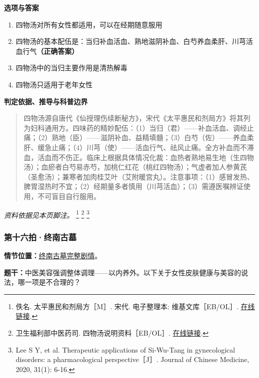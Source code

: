 \textbf{选项与答案}
\begin{enumerate}[label=\Alph*.,leftmargin=*]
  \item 四物汤对所有女性都适用，可以在经期随意服用
  \item 四物汤的基本配伍是：当归补血活血、熟地滋阴补血、白芍养血柔肝、川芎活血行气\textbf{（正确答案）}
  \item 四物汤中的当归主要作用是清热解毒
  \item 四物汤只适用于老年女性
\end{enumerate}
\textbf{判定依据、推导与科普边界}
\begin{quote}四物汤源自唐代《仙授理伤续断秘方》，宋代《太平惠民和剂局方》将其列为妇科通用方。四味药的精妙配伍：（1）当归（君）——补血活血、调经止痛；（2）熟地（臣）——滋阴补血、益精填髓；（3）白芍（佐）——养血柔肝、缓急止痛；（4）川芎（使）——活血行气、祛风止痛。全方补血而不滞血，活血而不伤正。临床上根据具体情况化裁：血热者熟地易生地（生四物汤）；血瘀者白芍易赤芍，加桃仁红花（桃红四物汤）；气虚者加人参黄芪（圣愈汤）；兼寒者加肉桂艾叶（艾附暖宫丸）。注意事项：（1）感冒发热、脾胃湿热时不宜；（2）经期量多者慎用（川芎活血）；（3）需遵医嘱辨证使用，不可盲目自行服用。\end{quote}
\noindent\textit{资料依据见本页脚注。}
\footnote{佚名. 太平惠民和剂局方［M］. 宋代. 电子整理本: 维基文库［EB/OL］. \href{https://zh.wikisource.org/zh-hans/太平惠民和劑局方}{在线链接}.}
\footnote{卫生福利部中医药司. 四物汤说明资料［EB/OL］. \href{https://dep.mohw.gov.tw/DOCMAP/fp-866-5530-108.html}{在线链接}.}
\footnote{Lee S Y, et al. Therapeutic applications of Si-Wu-Tang in gynecological disorders: a pharmacological perspective［J］. Journal of Chinese Medicine, 2020, 31(1): 6-16.}

\subsubsection{第十六拍·终南古墓}\label{question:zhouzhiruo:16}
\textbf{情节位置：}\hyperref[plot:zhouzhiruo:16]{终南古墓完整剧情}。

\textbf{题干：}中医美容强调整体调理——以内养外。以下关于女性皮肤健康与美容的说法，哪一项是不合理的？

